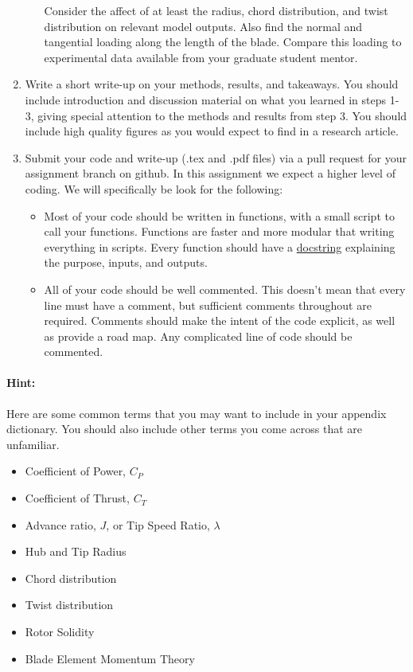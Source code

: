 \documentclass[12pt]{article}
\begin{document}
\begin{enumerate}
\begin{enumerate}
		Consider the affect of at least the radius, chord distribution, and twist distribution on relevant model outputs.
		Also find the normal and tangential loading along the length of the blade. Compare this loading to experimental data available from your graduate student mentor.   %
	\end{enumerate}
	\item Write a short write-up on your methods, results, and takeaways. You should include introduction and discussion material on what you learned in steps 1-3, giving special attention to the methods and results from step 3.  You should include high quality figures as you would expect to find in a research article. 
	\item Submit your code and write-up (.tex and .pdf files) via a pull request for your assignment branch on github. In this assignment we expect a higher level of coding. We will specifically be look for the following: 
	\begin{itemize}
		\item Most of your code should be written in functions, with a small script to call your functions. Functions are faster and more modular that writing everything in scripts.  Every function should have a \href{https://docs.julialang.org/en/v1/manual/documentation/#Writing-Documentation}{docstring} explaining the purpose, inputs, and outputs. 
		\item All of your code should be well commented. This doesn't mean that every line must have a comment, but sufficient comments throughout are required. Comments should make the intent of the code explicit, as well as provide a road map. Any complicated line of code should be commented. 
	\end{itemize}
\end{enumerate}

\bigskip

\paragraph{Hint:} Here are some common terms that you may want to include in your appendix dictionary. You should also include other terms you come across that are unfamiliar.

\begin{multicols}{2}
	\begin{itemize}
		\item Coefficient of Power, $C_P$
		\item Coefficient of Thrust, $C_T$
		\item Advance ratio, $J$, or Tip Speed Ratio, $\lambda$
		\item Hub and Tip Radius
		\item Chord distribution
		\item Twist distribution
		\item Rotor Solidity
		\item Blade Element Momentum Theory
	\end{itemize}
\end{multicols}
\end{document}
